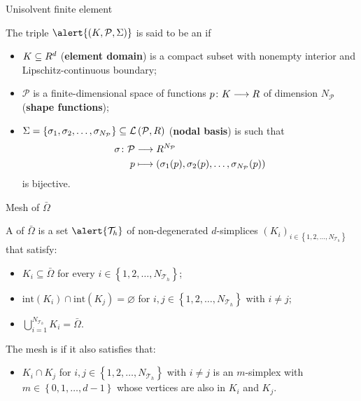 
\begin{frame}{Unisolvent finite element}

\begin{definicion}
	The triple $\alert{\left(K,\mathcal{P},\Sigma\right)}$ is said to be an  if
	\begin{itemize}
		\item $K\subseteq \relax R^d$ (\textbf{element domain}) is a compact subset with nonempty interior and Lipschitz-continuous boundary;
		\item $\mathcal{P}$ is a finite-dimensional space of functions $p\colon K\longrightarrow\relax R$ of dimension $N_\mathcal{P}$ (\textbf{shape functions});
		\item $\Sigma=\left\{\sigma_1,\sigma_2,\ldots,\sigma_{N_\mathcal{P}}\right\}\subseteq\mathcal{L}\left(\mathcal{P},\relax R\right)$ (\textbf{nodal basis}) is such that
		\begin{align*}
		\sigma\colon\mathcal{P}&\longrightarrow \relax R^{N_\mathcal{P}}\\
		p&\longmapsto \left(\sigma_1(p),\sigma_2(p),\ldots,\sigma_{N_\mathcal{P}}(p)\right)
		\end{align*}
		is bijective.
	\end{itemize}
\end{definicion}

\end{frame}

\begin{frame}{Mesh of $\bar{\Omega}$}

\begin{definicion}
	A  of $\bar{\Omega}$ is a set $\alert{\mathcal{T}_h}$ of non-degenerated $d$-simplices $\left(K_i\right)_{i\in\left\{1,2,\ldots,N_{\mathcal{T}_h}\right\}}$ that satisfy:
	\begin{itemize}
		\item $K_i\subseteq\bar\Omega$ for every $i\in\left\{1,2,\ldots,N_{\mathcal{T}_h}\right\}$;
		\item $\text{int}\left(K_i\right)\cap\text{int}\left(K_j\right)=\varnothing$ for $i,j\in\left\{1,2,\ldots,N_{\mathcal{T}_h} \right\}$ with $i\neq j$;
		\item $\displaystyle \bigcup_{i=1}^{N_{\mathcal{T}_h}} K_i=\bar\Omega$.
	\end{itemize}	
	The mesh is  if it also satisfies that:
	\begin{itemize}
		\item $K_i\cap K_j$ for $i,j\in\left\{1,2,\ldots,N_{\mathcal{T}_h} \right\}$ with $i\neq j$ is an $m$-simplex with $m\in\left\{0,1,\ldots,d-1 \right\}$ whose vertices are also in $K_i$ and $K_j$.
	\end{itemize}
\end{definicion}

\end{frame}

